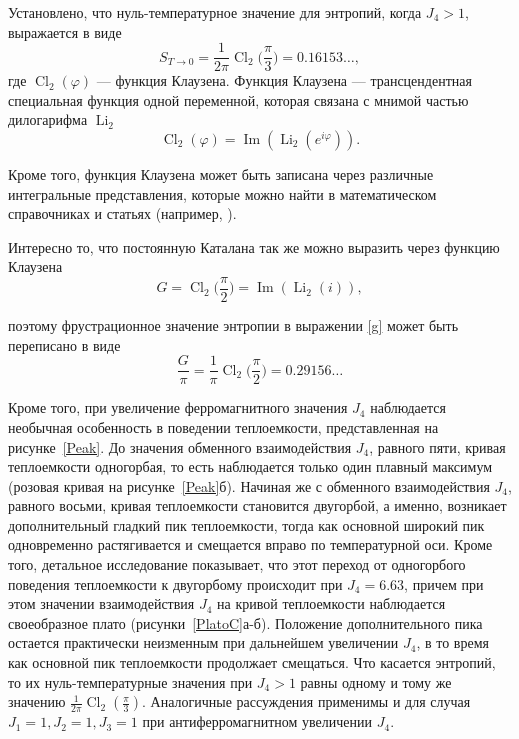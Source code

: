 \documentclass[utf8,12pt]{jetp}
\DeclareMathOperator{\Cl}{Cl}
\DeclareMathOperator{\Li}{Li}
\DeclareMathOperator{\im}{Im}
\begin{document}
Установлено, что нуль-температурное значение для энтропий, когда $J_4>1$, выражается в виде    
\begin{equation}
S_{T\rightarrow 0} = \frac{1}{2\pi} \Cl_2 \bigg(\frac{\pi}{3}\bigg)   = 0.16153\dots, 
\label{cl}
\end{equation} 
где  $\Cl_2 (\varphi)$ --- функция Клаузена. Функция Клаузена --- трансцендентная специальная функция одной переменной, которая связана с мнимой частью дилогарифма $\Li_2$
\begin{equation*}
\Cl_2 (\varphi) = \im (\Li_2 (e^{i \varphi})).
\end{equation*}

Кроме того, функция Клаузена может быть записана через различные интегральные представления, которые можно найти в математическом справочниках и статьях (например, \cite{abramowitz_stegun1972, wood1968}).

Интересно то, что постоянную Каталана так же можно выразить через функцию Клаузена~\cite{wood1968}
\begin{equation*}
G = \Cl_2 \bigg(\frac{\pi}{2}\bigg) = \im (\Li_2 (i)),
\end{equation*}

\noindent поэтому фрустрационное значение энтропии в выражении \eqref{g} может быть переписано в виде
\begin{equation}
\frac{G}{\pi} = \frac{1}{\pi} \Cl_2 \bigg(\frac{\pi}{2}\bigg) = 0.29156\dots
\end{equation}

Кроме того, при увеличение ферромагнитного значения $J_4$ наблюдается необычная особенность в поведении теплоемкости, представленная на рисунке~\ref{Peak}. До значения обменного взаимодействия $J_4$, равного пяти, кривая теплоемкости одногорбая, то есть наблюдается только один плавный максимум (розовая кривая на рисунке~\ref{Peak}б). Начиная же с обменного взаимодействия $J_4$, равного восьми, кривая теплоемкости становится двугорбой, а именно, возникает дополнительный гладкий пик теплоемкости, тогда как основной широкий пик одновременно растягивается и смещается вправо по температурной оси. Кроме того, детальное исследование показывает, что этот переход от одногорбого поведения теплоемкости к двугорбому происходит при $J_4=6.63$, причем при этом значении взаимодействия $J_4$ на кривой теплоемкости наблюдается своеобразное плато (рисунки~\ref{PlatoC}а-б). Положение дополнительного пика остается практически неизменным при дальнейшем увеличении $J_4$, в то время как основной пик теплоемкости продолжает смещаться. Что касается энтропий, то их нуль-температурные значения при $J_4>1$ равны одному и тому же значению $\frac{1}{2\pi} \Cl_2 (\frac{\pi}{3})$. Аналогичные рассуждения применимы и для случая $J_1 = 1, J_2 = 1, J_3 = 1$ при антиферромагнитном увеличении $J_4$.
\end{document}
